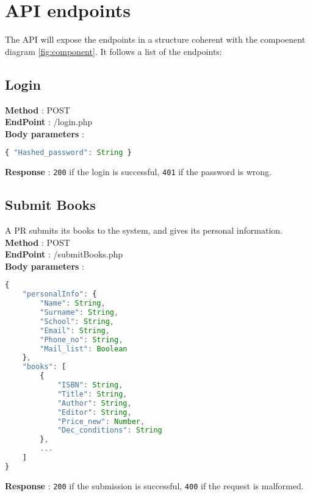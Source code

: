 \section{API endpoints}

The API will expose the endpoints in a structure coherent with the compoenent diagram \ref{fig:component}. It follows a list of the endpoints:

\subsection{Login}
\textbf{Method} : POST \\
\textbf{EndPoint} : /login.php \\
\textbf{Body parameters} :
\begin{lstlisting}[language=JavaScript, label={lst:jscode}, basicstyle=\ttfamily]
{ "Hashed_password": String }
\end{lstlisting}
\textbf{Response} : \texttt{200} if the login is successful, \texttt{401} if the password is wrong.

\subsection{Submit Books}
A PR submits its books to the system, and gives its personal information.\\
\textbf{Method} : POST \\
\textbf{EndPoint} : /submitBooks.php \\
\textbf{Body parameters} :
\begin{lstlisting}[language=JavaScript, label={lst:jscode}, basicstyle=\ttfamily]
{
    "personalInfo": {
        "Name": String,
        "Surname": String,
        "School": String,
        "Email": String,
        "Phone_no": String,
        "Mail_list": Boolean
    },
    "books": [
        {
            "ISBN": String,
            "Title": String,
            "Author": String,
            "Editor": String,
            "Price_new": Number,
            "Dec_conditions": String
        },
        ...
    ]
}
\end{lstlisting}
\textbf{Response} : \texttt{200} if the submission is successful, \texttt{400} if the request is malformed.

